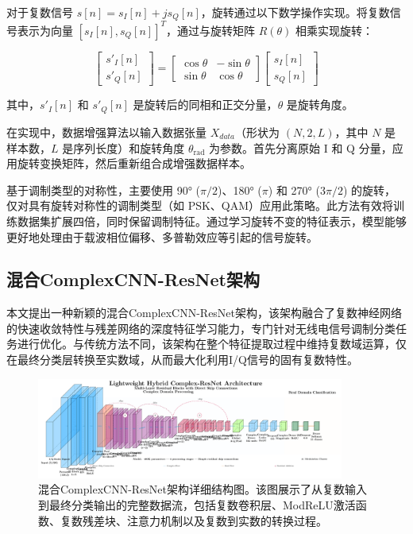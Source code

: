 \documentclass[conference]{IEEEtran}
\begin{document}
对于复数信号 \(s[n] = s_I[n] + j s_Q[n]\)，旋转通过以下数学操作实现。将复数信号表示为向量 \([s_I[n], s_Q[n]]^T\)，通过与旋转矩阵 \(R(\theta)\) 相乘实现旋转：

\[
\begin{bmatrix} s'_I[n] \\ s'_Q[n] \end{bmatrix} = \begin{bmatrix} \cos\theta & -\sin\theta \\ \sin\theta & \cos\theta \end{bmatrix} \begin{bmatrix} s_I[n] \\ s_Q[n] \end{bmatrix}
\]

其中，\(s'_I[n]\) 和 \(s'_Q[n]\) 是旋转后的同相和正交分量，\(\theta\) 是旋转角度。

在实现中，数据增强算法以输入数据张量 \(X_{data}\)（形状为 \((N, 2, L)\)，其中 \(N\) 是样本数，\(L\) 是序列长度）和旋转角度 \(\theta_{\text{rad}}\) 为参数。首先分离原始 I 和 Q 分量，应用旋转变换矩阵，然后重新组合成增强数据样本。

基于调制类型的对称性，主要使用 90° (\(\pi/2\))、180° (\(\pi\)) 和 270° (\(3\pi/2\)) 的旋转，仅对具有旋转对称性的调制类型（如 PSK、QAM）应用此策略。此方法有效将训练数据集扩展四倍，同时保留调制特征。通过学习旋转不变的特征表示，模型能够更好地处理由于载波相位偏移、多普勒效应等引起的信号旋转。


\subsection{混合ComplexCNN-ResNet架构}

本文提出一种新颖的混合ComplexCNN-ResNet架构，该架构融合了复数神经网络的快速收敛特性与残差网络的深度特征学习能力，专门针对无线电信号调制分类任务进行优化。与传统方法不同，该架构在整个特征提取过程中维持复数域运算，仅在最终分类层转换至实数域，从而最大化利用I/Q信号的固有复数特性。

\begin{figure}[htbp]
\centering
\includegraphics[width=0.9\textwidth]{figure/enhanced_hybrid_model.pdf}
\caption{混合ComplexCNN-ResNet架构详细结构图。该图展示了从复数输入到最终分类输出的完整数据流，包括复数卷积层、ModReLU激活函数、复数残差块、注意力机制以及复数到实数的转换过程。}
\label{fig:enhanced_hybrid_model}
\end{figure}
\end{document}

